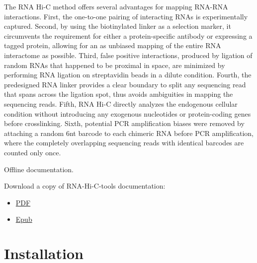 \documentclass[letterpaper,10pt,english]{sphinxmanual}
\begin{document}
The RNA Hi-C method offers several advantages for mapping RNA-RNA interactions. First, the one-to-one pairing of interacting RNAs is experimentally captured. Second, by using the biotinylated linker as a selection marker, it circumvents the requirement for either a protein-specific antibody or expressing a tagged protein, allowing for an as unbiased mapping of the entire RNA interactome as possible. Third, false positive interactions, produced by ligation of random RNAs that happened to be proximal in space, are minimized by performing RNA ligation on streptavidin beads in a dilute condition. Fourth, the predesigned RNA linker provides a clear boundary to split any sequencing read that spans across the ligation spot, thus avoids ambiguities in mapping the sequencing reads. Fifth, RNA Hi-C directly analyzes the endogenous cellular condition without introducing any exogenous nucleotides or protein-coding genes before crosslinking. Sixth, potential PCR amplification biases were removed by attaching a random 6nt barcode to each chimeric RNA before PCR amplification, where the completely overlapping sequencing reads with identical barcodes are counted only once.




Offline documentation.

Download a copy of RNA-Hi-C-tools documentation:
\begin{itemize}
\item {} 
\href{http://systemsbio.ucsd.edu/RNA-Hi-C/\_sources/RNA-HiC-tools.pdf}{PDF}

\item {} 
\href{http://systemsbio.ucsd.edu/RNA-Hi-C/epub/RNA-HiC-tools.epub}{Epub}

\end{itemize}




\section{Installation}
\label{RNA-Hi-C-tools:installation}
\end{document}
